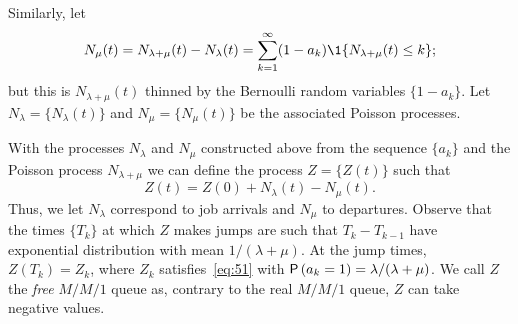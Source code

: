 Similarly, let
\begin{equation*}
  N_\mu(t) = N_{\lambda+\mu}(t) - N_\lambda(t) = \sum_{k=1}^\infty (1-a_k) \1{N_{\lambda+\mu}(t) \leq k};
\end{equation*}
but this is $N_{\lambda+\mu}(t)$ thinned by the Bernoulli random variables $\{1-a_k\}$. Let  $N_\lambda = \{N_\lambda(t)\}$ and $N_\mu = \{N_\mu(t)\}$  be the associated Poisson processes. 

With the processes $N_\lambda$ and $N_\mu$ constructed above from the sequence $\{a_k\}$ and the Poisson process $N_{\lambda+\mu}$ we can define the process $Z=\{Z(t)\}$ such that
\begin{equation*}
  Z(t) = Z(0)+N_\lambda(t) - N_\mu(t).
\end{equation*}
Thus, we let $N_\lambda$ correspond to job  arrivals and $N_\mu$ to departures. Observe that the times $\{T_k\}$ at which $Z$ makes jumps are such that $T_k-T_{k-1}$ have exponential distribution with mean $1/(\lambda+\mu)$. At the jump times, $Z(T_k) = Z_k$, where $Z_k$ satisfies~\eqref{eq:51} with $\P{a_k = 1} = \lambda/(\lambda+\mu)$.  We call $Z$ the \emph{free} $M/M/1$ queue as, contrary to the real $M/M/1$ queue, $Z$ can take negative values. 

